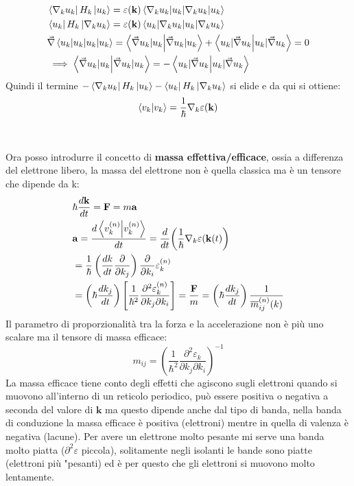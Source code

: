 \begin{equation}
    \begin{split}
    &\bra{\nabla_ku_k} H_k \ket{u_k} = \varepsilon(\mathbf{k}) \braket{\nabla_k u_k | u_k}\\
    &\bra{u_k} H_k \ket{\nabla_k u_k} = \varepsilon(\mathbf{k}) \braket{u_k |\nabla_k u_k} \\
    & \vec{\nabla} \braket{u_k | u_k} = \braket{\vec{\nabla} u_k | u_k} + \braket{u_k | \vec{\nabla} u_k} = 0 \\
    & \implies \braket{\vec{\nabla} u_k | u_k} = - \braket{u_k | \vec{\nabla} u_k} 
    \end{split}
\end{equation}
Quindi il termine $-  \bra{\nabla_ku_k} H_k \ket{u_k} - \bra{u_k} H_k \ket{\nabla_k u_k}$ si elide e da qui si ottiene:
\begin{equation}
    \braket{v_k}= \frac{1}{\hbar} \mathbf{\nabla}_k\varepsilon(\mathbf{k})
\end{equation}
\\\\
Ora posso introdurre il concetto di \textbf{massa effettiva/efficace}, ossia a differenza del elettrone libero, la massa del elettrone non è quella classica ma è un tensore che dipende da k:
\begin{equation}
\begin{split}
    &\hbar \frac{d\mathbf{k}}{dt} = \mathbf{F} = m\mathbf{a}\\
    &\mathbf{a}=\frac{d\braket{v_k^{(n)}}}{dt} = \frac{d}{dt} \biggr(\frac{1}{\hbar}\mathbf{\nabla}_k\varepsilon(\mathbf{k}(t)\biggr)\\
    &=\frac{1}{\hbar}\left( \frac{dk}{dt} \frac{\partial}{\partial k_j} \right) \frac{\partial}{\partial k_i}\varepsilon_k^{(n)} \\
    &= \left( \hbar \frac{dk_j}{dt}\right)\left[ \frac{1}{\hbar^2} \frac{\partial^2 \varepsilon_k^{(n)}}{\partial k_j \partial k_i}\right]= \frac{\mathbf{F}}{m} = \left( \hbar \frac{dk_j}{dt}\right) \frac{1}{\overline{m}_{ij}^{(n)}(k)}
\end{split}
\end{equation} 
Il parametro di proporzionalità tra la forza e la accelerazione non è più uno scalare ma il tensore di massa efficace:
\begin{equation}
    m_{ij} = \left( \frac{1}{\hbar^2} \frac{\partial^2 \varepsilon_k}{\partial k_j \partial k_i}\right)^{-1}
\end{equation}
La massa efficace tiene conto degli effetti che agiscono sugli elettroni quando si muovono all'interno di un reticolo periodico, può essere positiva o negativa a seconda del valore di $\mathbf{k}$ ma questo dipende anche dal tipo di banda, nella banda di conduzione la massa efficace è positiva (elettroni) mentre in quella di valenza è negativa (lacune). Per avere un elettrone molto pesante mi serve una banda molto piatta ($\partial^2\varepsilon$ piccola), solitamente negli isolanti le bande sono piatte (elettroni più "pesanti) ed è per questo che gli elettroni si muovono molto lentamente. 

